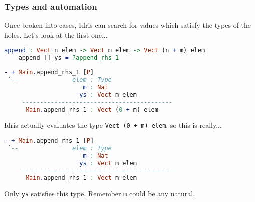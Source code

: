 \documentclass{beamer}
\begin{document}
\begin{frame}[fragile]
  \frametitle{Types and automation}

  Once broken into cases, Idris can search for values which satisfy the types of the holes. Let's look at the first one...

  \pause

  \begin{lstlisting}[language=Idris]
    append : Vect n elem -> Vect m elem -> Vect (n + m) elem
    append [] ys = ?append_rhs_1
  \end{lstlisting}

  \begin{lstlisting}[language=Idris]
- + Main.append_rhs_1 [P]
 `--               elem : Type
                      m : Nat
                     ys : Vect m elem
     ------------------------------------------
      Main.append_rhs_1 : Vect (0 + m) elem
  \end{lstlisting}

  \pause
  
  Idris actually evaluates the type \texttt{Vect (0 + m) elem}, so this is really...

  \pause

  \begin{lstlisting}[language=Idris]
- + Main.append_rhs_1 [P]
 `--               elem : Type
                      m : Nat
                     ys : Vect m elem
     ------------------------------------------
      Main.append_rhs_1 : Vect m elem
  \end{lstlisting}

  \pause

  Only \texttt{ys} satisfies this type. Remember \texttt{m} could be any natural.
\end{frame}
\end{document}
